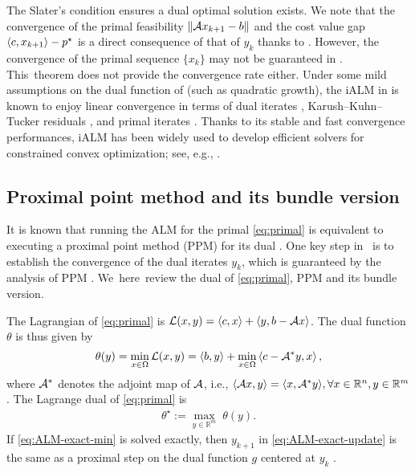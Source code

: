 \documentclass[11pt]{article}
\begin{document}
The Slater's condition ensures a dual optimal solution exists. We note that the convergence of the primal feasibility $\|\mathcal{A} x_{k+1} - b\|$ and the cost value gap $\left \langle c, x_{k+1} \right\rangle - p^\star $ is a direct consequence of that of $y_k$ thanks to . However, the convergence of the primal sequence $\{x_k\}$ may not be guaranteed in . This~theorem does not provide the convergence rate either. Under some mild assumptions on the dual function of  (such as quadratic growth), the iALM in  is known to enjoy linear convergence in terms of dual iterates \cite{rockafellar1976augmented,luque1984asymptotic}, Karush–Kuhn–Tucker residuals \cite{cui2019r}, and primal iterates \cite{liao2024inexact}. Thanks to its stable and fast convergence performances, iALM has been widely used to develop efficient solvers for constrained convex optimization; see, e.g.,  \cite{birgin2014practical,yang2015sdpnal+,yurtsever2021scalable}. 

\subsection{Proximal point method and its bundle version} 
\label{subsection:bundle}

It is known that running the ALM for the primal \cref{eq:primal} is equivalent to executing a proximal point method (PPM) for its dual \cite{rockafellar1976augmented}. One key step in~ is to establish the convergence of the dual iterates $y_k$, which is guaranteed by the analysis of PPM \cite{rockafellar1976monotone}. We~here~review the dual of \cref{eq:primal}, PPM and its bundle version. 

The Lagrangian of \eqref{eq:primal} is  $\mathcal{L}(x,y) =\left \langle c, x \right\rangle + \left \langle y, b-\mathcal{A} x \right\rangle$. The dual function $\theta$ is thus given by
\begin{equation} \label{eq:dual-function}
     \theta(y) = \min_{x\in \Omega} \mathcal{L}(x,y)  = \left \langle b, y \right\rangle + \min_{x \in \Omega } \left \langle c-\mathcal{A}^* y, x \right\rangle, 
\end{equation}
where $\mathcal{A}^*$ denotes the adjoint map of $\mathcal{A}$, i.e., $\langle \mathcal{A} x, y \rangle = \langle x, \mathcal{A}^* y  \rangle, \forall x \in \mathbb{R}^n, y \in \mathbb{R}^m$. The Lagrange dual of \eqref{eq:primal} is  
\begin{equation}
    \label{eq:dual}
    \begin{aligned}
       \theta^\star := \max_{y \in \mathbb{R}^m}  \; \theta(y). 
    \end{aligned}
    \tag{D}
\end{equation}
If \eqref{eq:ALM-exact-min} is solved exactly, then $y_{k+1}$ in \eqref{eq:ALM-exact-update} is the same as a proximal step on the dual function $g$ centered at $y_k$ \cite[Proposition 6]{rockafellar1976augmented}. 
\end{document}
